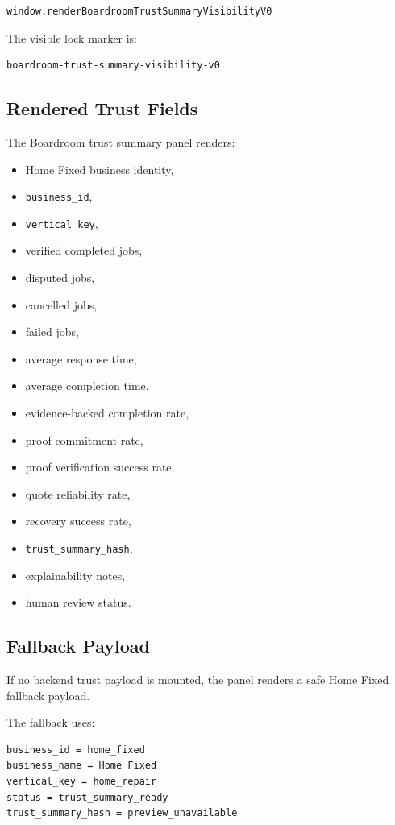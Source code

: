 \begin{verbatim}
window.renderBoardroomTrustSummaryVisibilityV0
\end{verbatim}

The visible lock marker is:

\begin{verbatim}
boardroom-trust-summary-visibility-v0
\end{verbatim}

\subsection{Rendered Trust Fields}

The Boardroom trust summary panel renders:

\begin{itemize}
  \item Home Fixed business identity,
  \item \texttt{business\_id},
  \item \texttt{vertical\_key},
  \item verified completed jobs,
  \item disputed jobs,
  \item cancelled jobs,
  \item failed jobs,
  \item average response time,
  \item average completion time,
  \item evidence-backed completion rate,
  \item proof commitment rate,
  \item proof verification success rate,
  \item quote reliability rate,
  \item recovery success rate,
  \item \texttt{trust\_summary\_hash},
  \item explainability notes,
  \item human review status.
\end{itemize}

\subsection{Fallback Payload}

If no backend trust payload is mounted, the panel renders a safe Home Fixed fallback payload.

The fallback uses:

\begin{verbatim}
business_id = home_fixed
business_name = Home Fixed
vertical_key = home_repair
status = trust_summary_ready
trust_summary_hash = preview_unavailable
\end{verbatim}

